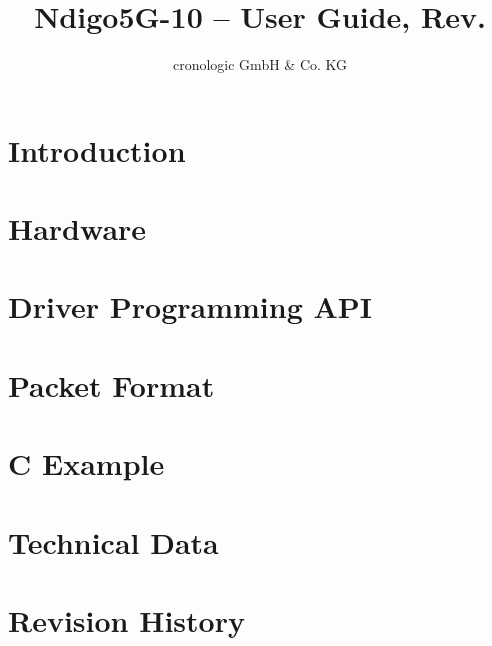 \documentclass[12pt,notitlepage,a4paper]{report}
\title{Ndigo5G-10 -- User Guide, Rev. \ugrev}
\author{cronologic GmbH & Co. KG}
\begin{document}
    \RaggedRight
    
    \cleardoublepage
    \tableofcontents
    \clearpage
    \chapter{Introduction}
        
    \chapter{Hardware}
        
    \chapter{Driver Programming API}
        
    \chapter{Packet Format\label{cp:packetformat}}
        
    \chapter{C Example}
        
    \chapter{Technical Data}
        
        
    \chapter{Revision History}
        
        
        
\end{document}
